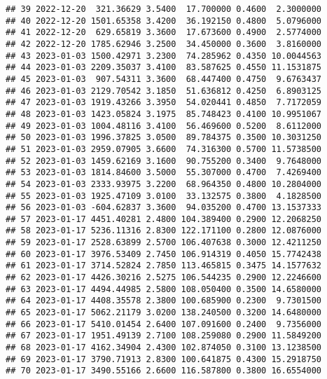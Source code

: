 \documentclass[
]{article}
\begin{document}
\begin{verbatim}
## 39 2022-12-20  321.36629 3.5400  17.700000 0.4600  2.3000000
## 40 2022-12-20 1501.65358 3.4200  36.192150 0.4800  5.0796000
## 41 2022-12-20  629.65819 3.3600  17.673600 0.4900  2.5774000
## 42 2022-12-20 1785.62946 3.2500  34.450000 0.3600  3.8160000
## 43 2023-01-03 1500.42971 3.2300  74.285962 0.4350 10.0044563
## 44 2023-01-03 2209.35037 3.4100  83.587625 0.4550 11.1531875
## 45 2023-01-03  907.54311 3.3600  68.447400 0.4750  9.6763437
## 46 2023-01-03 2129.70542 3.1850  51.636812 0.4250  6.8903125
## 47 2023-01-03 1919.43266 3.3950  54.020441 0.4850  7.7172059
## 48 2023-01-03 1423.05824 3.1975  85.748423 0.4100 10.9951067
## 49 2023-01-03 1004.48116 3.4100  56.469600 0.5200  8.6112000
## 50 2023-01-03 1996.37825 3.0500  89.784375 0.3500 10.3031250
## 51 2023-01-03 2959.07905 3.6600  74.316300 0.5700 11.5738500
## 52 2023-01-03 1459.62169 3.1600  90.755200 0.3400  9.7648000
## 53 2023-01-03 1814.84600 3.5000  55.307000 0.4700  7.4269400
## 54 2023-01-03 2333.93975 3.2200  68.964350 0.4800 10.2804000
## 55 2023-01-03 1925.47109 3.0100  33.132575 0.3800  4.1828500
## 56 2023-01-03 -604.62837 3.3600  94.035200 0.4700 13.1537333
## 57 2023-01-17 4451.40281 2.4800 104.389400 0.2900 12.2068250
## 58 2023-01-17 5236.11316 2.8300 122.171100 0.2800 12.0876000
## 59 2023-01-17 2528.63899 2.5700 106.407638 0.3000 12.4211250
## 60 2023-01-17 3976.53409 2.7450 106.914319 0.4050 15.7742438
## 61 2023-01-17 3714.52824 2.7850 113.465815 0.3475 14.1577632
## 62 2023-01-17 4426.30216 2.5275 106.544235 0.2900 12.2246600
## 63 2023-01-17 4494.44985 2.5800 108.050400 0.3500 14.6580000
## 64 2023-01-17 4408.35578 2.3800 100.685900 0.2300  9.7301500
## 65 2023-01-17 5062.21179 3.0200 138.240500 0.3200 14.6480000
## 66 2023-01-17 5410.01454 2.6400 107.091600 0.2400  9.7356000
## 67 2023-01-17 1951.49139 2.7100 108.259080 0.2900 11.5849200
## 68 2023-01-17 4162.34904 2.4300 102.874050 0.3100 13.1238500
## 69 2023-01-17 3790.71913 2.8300 100.641875 0.4300 15.2918750
## 70 2023-01-17 3490.55166 2.6600 116.587800 0.3800 16.6554000
\end{verbatim}
\end{document}
